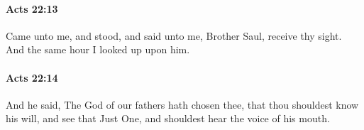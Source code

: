		\paragraph{Acts 22:13} %
			\label{ACTS-22-13}

			Came unto me, and stood, and said unto me, Brother Saul, receive thy sight.  And the same hour I looked up upon him.

			\begin{framed}
			\scriptsize
				\begin{compactdesc}
					\item[SBLG] 
				\end{compactdesc}
			\end{framed}

		\paragraph{Acts 22:14} %
			\label{ACTS-22-14}

			And he said, The God of our fathers hath chosen thee, that thou shouldest know his will, and see that Just One, and shouldest hear the voice of his mouth.

